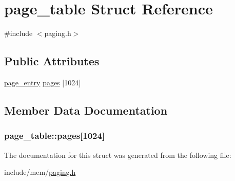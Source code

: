 \hypertarget{structpage__table}{}\section{page\+\_\+table Struct Reference}
\label{structpage__table}


{\ttfamily \#include $<$paging.\+h$>$}

\subsection*{Public Attributes}
\begin{DoxyCompactItemize}
\item 
\hyperlink{structpage__entry}{page\+\_\+entry} \hyperlink{structpage__table_aa066e0fa847ce2fafb6a2feddfa340ff}{pages} \mbox{[}1024\mbox{]}
\end{DoxyCompactItemize}


\subsection{Member Data Documentation}
\hypertarget{structpage__table_aa066e0fa847ce2fafb6a2feddfa340ff}{}
\subsubsection[{pages}]{ page\+\_\+table\+::pages\mbox{[}1024\mbox{]}}\label{structpage__table_aa066e0fa847ce2fafb6a2feddfa340ff}


The documentation for this struct was generated from the following file\+:\begin{DoxyCompactItemize}
\item 
include/mem/\hyperlink{paging_8h}{paging.\+h}\end{DoxyCompactItemize}

